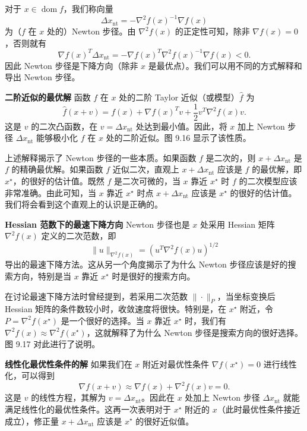 \documentclass[UTF8,12pt,a4paper,fontset=fandol]{ctexart}
\begin{document}
对于 $x\in\operatorname{dom} f$，我们称向量
\[
\Delta x_{\mathrm{nt}}=-\nabla^2f(x)^{-1}\nabla f(x)
\]
为（$f$ 在 $x$ 处的）Newton 步径。由 $\nabla^2 f(x)$ 的正定性可知，除非 $\nabla f(x)=0$，否则就有
\[
\nabla f(x)^T\Delta x_{\mathrm{nt}}=-\nabla f(x)^T\nabla^2 f(x)^{-1}\nabla f(x)<0.
\]
因此 Newton 步径是下降方向（除非 $x$ 是最优点）。我们可以用不同的方式解释和导出 Newton 步径。

\noindent\textbf{二阶近似的最优解}\quad
函数 $f$ 在 $x$ 处的二阶 Taylor 近似（或模型）$\hat{f}$ 为
\begin{equation}
\hat{f}(x+v)=f(x)+\nabla f(x)^Tv+\frac{1}{2}v^T\nabla^2 f(x)v.
\tag{9.28}
\end{equation}
这是 $v$ 的二次凸函数，在 $v=\Delta x_{\mathrm{nt}}$ 处达到最小值。因此，将 $x$ 加上 Newton 步径 $\Delta x_{\mathrm{nt}}$ 能够极小化 $f$ 在 $x$ 处的二阶近似。图 9.16 显示了该性质。

上述解释揭示了 Newton 步径的一些本质。如果函数 $f$ 是二次的，则 $x+\Delta x_{\mathrm{nt}}$ 是 $f$ 的精确最优解。如果函数 $f$ 近似二次，直观上 $x+\Delta x_{\mathrm{nt}}$ 应该是 $f$ 的最优解，即 $x^\star$，的很好的估计值。既然 $f$ 是二次可微的，当 $x$ 靠近 $x^\star$ 时 $f$ 的二次模型应该非常准确。由此可知，当 $x$ 靠近 $x^\star$ 时点 $x+\Delta x_{\mathrm{nt}}$ 应该是 $x^\star$ 的很好的估计值。我们将会看到这个直观上的认识是正确的。

\noindent\textbf{Hessian 范数下的最速下降方向}\quad
Newton 步径也是 $x$ 处采用 Hessian 矩阵 $\nabla^2f(x)$ 定义的二次范数，即
\[
\|u\|_{\nabla^2 f(x)}=(u^T\nabla^2f(x)u)^{1/2}
\]
导出的最速下降方法。这从另一个角度揭示了为什么 Newton 步径应该是好的搜索方向，特别是当 $x$ 靠近 $x^\star$ 时是很好的搜索方向。

在讨论最速下降方法时曾经提到，若采用二次范数 $\|\cdot\|_P$，当坐标变换后 Hessian 矩阵的条件数较小时，收敛速度将很快。特别是，在 $x^\star$ 附近，令 $P=\nabla^2f(x^\star)$ 是一个很好的选择。当 $x$ 靠近 $x^\star$ 时，我们有 $\nabla^2f(x)\approx\nabla^2f(x^\star)$，这就解释了为什么 Newton 步径是搜索方向的很好选择。图 9.17 对此进行了说明。

\noindent\textbf{线性化最优性条件的解}\quad
如果我们在 $x$ 附近对最优性条件 $\nabla f(x^\star)=0$ 进行线性化，可以得到
\[
\nabla f(x+v)\approx\nabla f(x)+\nabla^2f(x)v=0.
\]
这是 $v$ 的线性方程，其解为 $v=\Delta x_{\mathrm{nt}}$。因此在 $x$ 处加上 Newton 步径 $\Delta x_{\mathrm{nt}}$ 就能满足线性化的最优性条件。这再一次表明对于 $x^\star$ 附近的 $x$（此时最优性条件接近成立），修正量 $x+\Delta x_{\mathrm{nt}}$ 应该是 $x^\star$ 的很好近似值。
\end{document}
